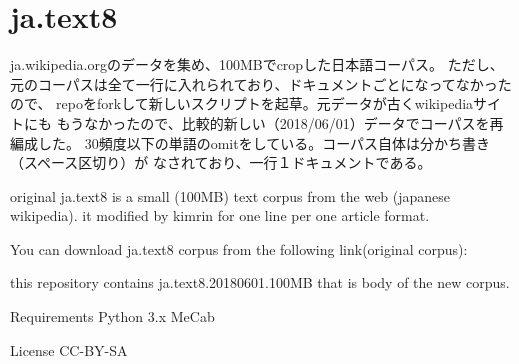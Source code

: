 \documentclass[uplatex,dvipdfmx]{jsarticle}
\begin{document}
\section{ja.text8}
ja.wikipedia.orgのデータを集め、100MBでcropした日本語コーパス。
ただし、元のコーパスは全て一行に入れられており、ドキュメントごとになってなかったので、
repoをforkして新しいスクリプトを起草。元データが古くwikipediaサイトにも
もうなかったので、比較的新しい（2018/06/01）データでコーパスを再編成した。
30頻度以下の単語のomitをしている。コーパス自体は分かち書き（スペース区切り）が
なされており、一行１ドキュメントである。

original ja.text8 is a small (100MB) text corpus from the web (japanese wikipedia). it modified by kimrin for one line per one article format.

You can download ja.text8 corpus from the following link(original corpus):

this repository contains ja.text8.20180601.100MB that is body of the new corpus.

Requirements
Python 3.x
MeCab

License
CC-BY-SA
\end{document}
